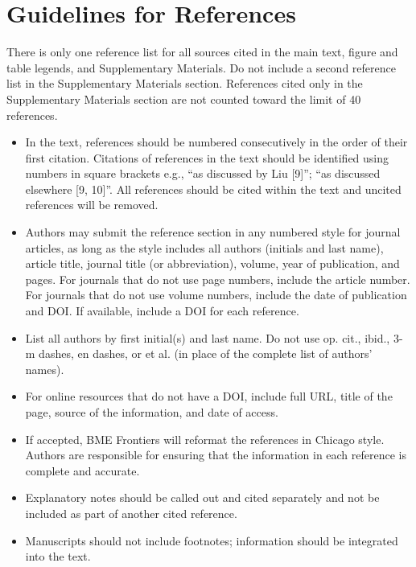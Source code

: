 \documentclass{article}
\begin{document}
\section*{Guidelines for References}
There is only one reference list for all sources cited in the main text, figure and table legends, and Supplementary Materials. Do not include a second reference list in the Supplementary Materials section. References cited only in the Supplementary Materials section are not counted toward the limit of 40 references.
\begin{itemize}
    \item In the text, references should be numbered consecutively in the order of their first citation. Citations of references in the text should be identified using numbers in square brackets e.g., “as discussed by Liu [9]”; “as discussed elsewhere [9, 10]”. All references should be cited within the text and uncited references will be removed.
    \item Authors may submit the reference section in any numbered style for journal articles, as long as the style includes all authors (initials and last name), article title, journal title (or abbreviation), volume, year of publication, and pages. For journals that do not use page numbers, include the article number. For journals that do not use volume numbers, include the date of publication and DOI. If available, include a DOI for each reference.
    \item List all authors by first initial(s) and last name. Do not use op. cit., ibid., 3-m dashes, en dashes, or et al. (in place of the complete list of authors’ names).
    \item For online resources that do not have a DOI, include full URL, title of the page, source of the information, and date of access.
    \item If accepted, BME Frontiers will reformat the references in Chicago style. Authors are responsible for ensuring that the information in each reference is complete and accurate.
    \item Explanatory notes should be called out and cited separately and not be included as part of another cited reference. 
    \item Manuscripts should not include footnotes; information should be integrated into the text.  
\end{itemize}

\printbibliography
\end{document}
